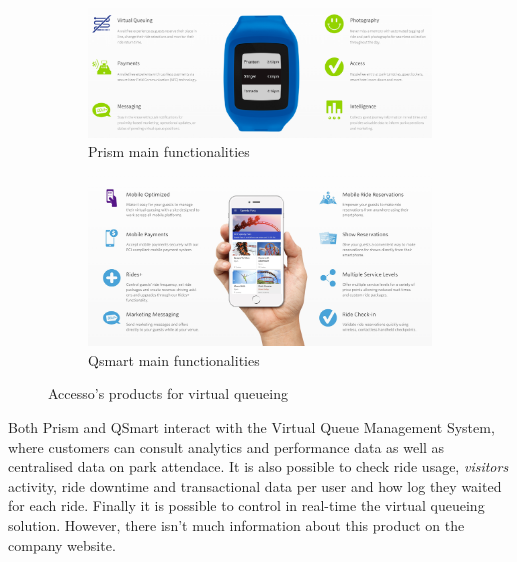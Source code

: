 \begin{figure}[H]
    \centering
    \begin{subfigure}[b]{0.85\textwidth}
        \centering
        \includegraphics[width=\textwidth]{img/prism}
        \caption{Prism main functionalities}
        \label{fig:prism}
    \end{subfigure}
    \hfill
    \begin{subfigure}[b]{0.85\textwidth}
        \centering
        \includegraphics[width=\textwidth]{img/qsmart}
        \caption{Qsmart main functionalities}
        \label{fig:qsmart}
    \end{subfigure}
    \caption{Accesso's products for virtual queueing\protect\footnotemark}
    \label{fig:prismart}
\end{figure}

Both Prism and QSmart interact with the Virtual Queue Management System, where customers can consult
analytics and performance data as well as centralised data on park attendace.
It is also possible to check ride usage, \textit{visitors} activity, ride downtime and transactional data per user and how log they waited for each ride.
Finally it is possible to control in real-time the virtual queueing solution.
However, there isn't much information about this product on the company website.

